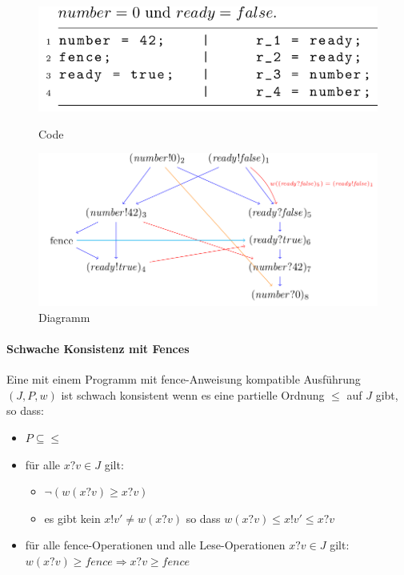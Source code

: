 \documentclass[a4paper,10pt, oneside]{book}
\begin{document}
\begin{figure}[htb]
	
	\begin{minipage}[t]{0.3\linewidth}
		\centering
		\includegraphics[scale=0.3]{fenceCode}
		\caption{Code}
	\end{minipage}
	\hfill
	\begin{minipage}[t]{0.6\linewidth}
		\centering
		\includegraphics[scale=0.3]{fenceDia}
		\caption{Diagramm}
	\end{minipage}
\end{figure}

\paragraph{Schwache Konsistenz mit Fences}
Eine mit einem Programm mit fence-Anweisung kompatible Ausführung $(J,P,w)$ ist schwach konsistent wenn es eine partielle Ordnung $\leq$ auf $J$ gibt, so dass:
\begin{itemize}
	\item $P \subseteq \leq$
	\item für alle $x?v \in J$ gilt:
	\begin{itemize}
		\item $\neg(w(x?v) \geq x?v)$
		\item es gibt kein $x!v' \not= w(x?v)$ so dass $w(x?v) \leq x!v' \leq x?v$
	\end{itemize}
	\item für alle fence-Operationen und alle Lese-Operationen $x?v \in J$ gilt: $w(x?v) \geq fence \Rightarrow x?v \geq fence$
\end{itemize}
\end{document}
